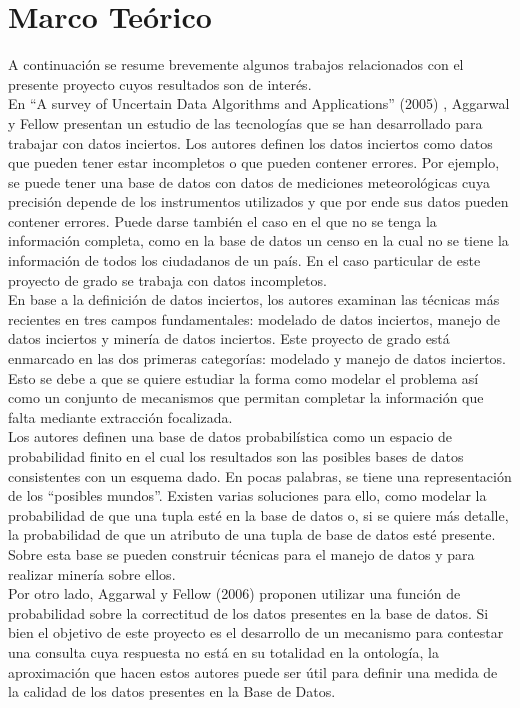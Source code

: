 \chapter{Marco Teórico} \label{chap:marcoTeorico}

A continuación se resume brevemente algunos trabajos relacionados con el presente proyecto cuyos resultados son de interés. \\

En “A survey of Uncertain Data Algorithms and Applications” (2005) \cite{surveyUDAA}, Aggarwal  y Fellow presentan un  estudio de las tecnologías que se han desarrollado para trabajar con datos inciertos. Los autores definen los datos inciertos como datos que pueden tener estar incompletos o que pueden contener errores. Por ejemplo, se puede tener una base de datos con datos de mediciones meteorológicas cuya precisión depende de los instrumentos utilizados y que por ende sus datos pueden contener errores. Puede darse también el caso en el que no se tenga la información completa, como en la base de datos un censo en la cual no se tiene la información de todos los ciudadanos de un país. En el caso particular de este proyecto de grado se trabaja con datos incompletos. \\

En base a la definición de datos inciertos, los autores examinan las técnicas más recientes en tres campos fundamentales: modelado de datos inciertos, manejo de datos inciertos y minería de datos inciertos. Este proyecto de grado está enmarcado en las dos primeras categorías: modelado y manejo de datos inciertos. Esto se debe a que se quiere estudiar la forma como modelar el problema así como un conjunto de mecanismos que permitan completar la información que falta mediante extracción focalizada. \\

Los autores definen  una base de datos probabilística como un espacio de probabilidad finito en el cual los resultados son las posibles bases de datos consistentes con un esquema dado. En pocas palabras, se tiene una representación de los “posibles mundos”. Existen varias soluciones para ello, como modelar la probabilidad de que una tupla esté en la base de datos o, si se quiere más detalle, la probabilidad de que un atributo de una tupla de base de datos esté presente. Sobre esta base se pueden construir técnicas para el manejo de datos y para realizar minería sobre ellos. \\

Por otro lado, Aggarwal y Fellow (2006) \cite{surveyUDAA} proponen  utilizar una función de probabilidad sobre la correctitud de los datos presentes en la base de datos. Si bien el objetivo de este proyecto es el desarrollo de un mecanismo para contestar una consulta cuya respuesta no está en su totalidad en la ontología, la aproximación que hacen estos autores puede ser útil para definir una medida de la calidad de los datos presentes en la Base de Datos. \\

